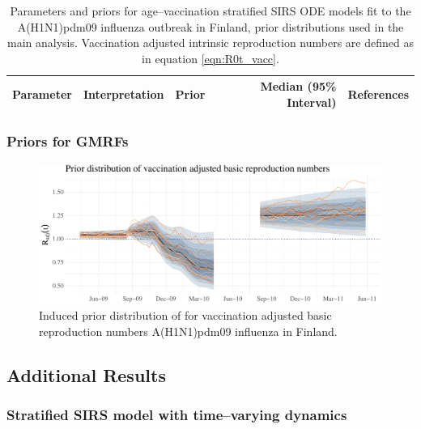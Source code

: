 \begin{table}
	\begin{fullpage}
		\caption[Parameters and priors for age--vaccination stratified SIRS ODE models fit to the A(H1N1)pdm09 influenza outbreak in Finland.]{Parameters and priors for age--vaccination stratified SIRS ODE models fit to the A(H1N1)pdm09 influenza outbreak in Finland, prior distributions used in the main analysis. Vaccination adjusted intrinsic reproduction numbers are defined as in equation \ref{eqn:R0t_vacc}.}
		\label{tab:flu_priors}
		\scriptsize
		\centering
		\begin{tabular}{lllrr}
			\hline
			\textbf{Parameter} &  \textbf{Interpretation} & \textbf{Prior} & \textbf{Median (95\% Interval)} & \textbf{References} \\ \hline
			\hline
		\end{tabular}
	\end{fullpage}
\end{table}

\subsubsection{Priors for GMRFs}
\label{subsubsec:flu_gmrf_priors}

\begin{figure}
	\centering
	\includegraphics[width=\linewidth]{figures/flu_RW1_prior}
	\caption{Induced prior distribution of for vaccination adjusted basic reproduction numbers A(H1N1)pdm09 influenza in Finland.}
	\label{fig:flurw1prior}
\end{figure}


\subsection{Additional Results}
\label{subsec:flu_additional_results}

\subsubsection{Stratified SIRS model with time--varying dynamics}
\label{subsubsec:flu_additional_res_rw1}

